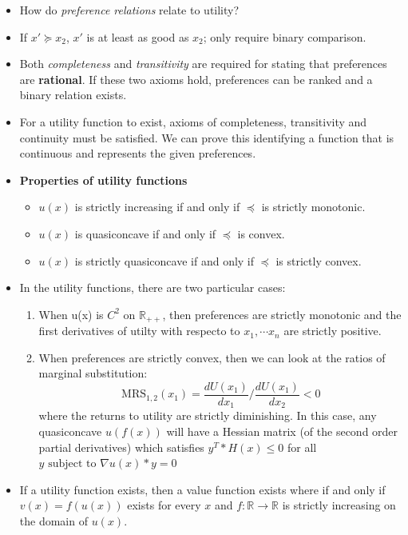 \documentclass{article}
\begin{document}
\begin{itemize}
    \item How do \textit{preference relations} relate to utility? 
    \item If $x' \succeq x_{2}$, $x'$ is at least as good as $x_{2}$; only require binary comparison. %
    \item Both \textit{completeness} and \textit{transitivity} are required for stating that preferences are \textbf{rational}. If these two axioms hold, preferences can be ranked and a binary relation exists. 
    \item For a utility function to exist, axioms of completeness, transitivity and continuity must be satisfied. We can prove this identifying a function that is continuous and represents the given preferences. 
    \item \textbf{Properties of utility functions}
    \begin{itemize}
        \item $u(x)$ is strictly increasing if and only if $\preceq$ is strictly monotonic.
        \item $u(x)$ is quasiconcave if and only if $\preceq$ is convex.
        \item $u(x)$ is strictly quasiconcave if and only if $\preceq$ is strictly convex.
    \end{itemize}
    \item In the utility functions, there are two particular cases:
    \begin{enumerate}
        \item When u(x) is $C^2$ on $\mathbb{R_{++}}$, then preferences are strictly monotonic and the first derivatives of utilty with respecto to $x_{1}, \cdots x_{n}$ are strictly positive. 
        \item When preferences are strictly convex, then we can look at the ratios of marginal substitution: 
        \[
        \text{MRS}_{1,2}(x_1) = \frac{dU(x_1)}{dx_1} \Big/ \frac{dU(x_1)}{dx_2} < 0
        \]
        where the returns to utility are strictly diminishing. In this case, any quasiconcave $u(f(x))$ will have a Hessian matrix (of the second order partial derivatives) which satisfies $y^T*H(x) \leq 0$ for all $y  \text{ subject to }  \nabla u(x)*y = 0$
    \end{enumerate}
    \item If a utility function exists, then a value function exists where if and only if $v(x) = f(u(x))$ exists for every $x$ and $f: \mathbb{R} \to \mathbb{R}$ is strictly increasing on the domain of $u(x)$. 

\end{itemize}
\end{document}
